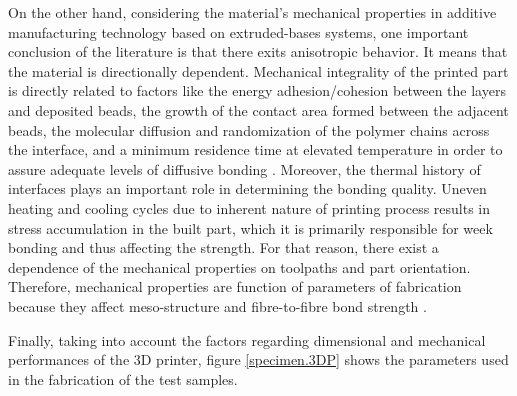 \begin{enumerate}[leftmargin=0in, label=\emph{\alph*}.]
	On the other hand, considering the material's mechanical properties in additive manufacturing technology based on extruded-bases systems, one important conclusion of the literature is that there exits anisotropic behavior. It means that the material is directionally dependent.
	Mechanical integrality of the printed part is directly related to factors like the energy adhesion/cohesion between the layers and deposited beads, the growth of the contact area formed between the adjacent beads, the molecular diffusion and randomization of the polymer chains across the interface, and a minimum residence time at elevated temperature in order to assure adequate levels of diffusive bonding \parencite{AtifYardimci1996,Yardimci1997, Agarwala1996,Sun2008}.
	Moreover, the thermal history of interfaces plays an important role in determining the bonding quality. 
	Uneven heating and cooling cycles due to inherent nature of printing process results in stress accumulation in the built part, which it is primarily responsible for week bonding and thus affecting the strength. 
	For that reason, there exist a dependence of the mechanical properties on toolpaths and part orientation.
	Therefore, mechanical properties are function of parameters of fabrication because they affect meso-structure and fibre-to-fibre bond strength 
	\parencite{Es-Said2000,Ahn2002,Bellini2003, Lee2005,Lee2007, Sood2010,Sood2012,Croccolo2013, Tymrak2014a}.
	
	Finally, taking  into account the factors regarding dimensional and mechanical performances of the 3D printer, figure \ref{specimen.3DP} shows the parameters used in the fabrication of the test samples.
	
	\begin{figure}[H]
		\centering
		

\end{figure}
\end{enumerate}

